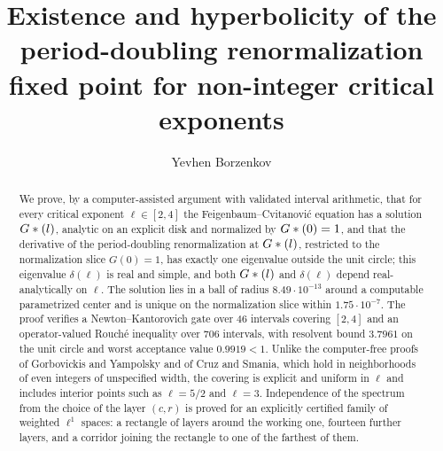 
\title[Hyperbolicity of renormalization at a non-integer exponent]
      {Existence and hyperbolicity of the period-doubling renormalization
       fixed point for non-integer critical exponents}

\ifx\ANONYMOUS\undefined
  \author{Yevhen Borzenkov}
  \address{Independent researcher, Bratislava, Slovakia}
\fi


\begin{abstract}
We prove, by a computer-assisted argument with validated interval arithmetic,
that for every critical exponent $\ell \in [2,4]$ the Feigenbaum--Cvitanovi\'{c}
equation has a solution $G*(l)$, analytic on an explicit disk and normalized
by $G*(0) = 1$, and that the derivative of the period-doubling renormalization
at $G*(l)$, restricted to the normalization slice $G(0) = 1$, has exactly one
eigenvalue outside the unit circle; this
eigenvalue $\delta(\ell)$ is real and simple, and both $G*(l)$ and
$\delta(\ell)$ depend real-analytically on $\ell$. The solution lies in a ball of
radius $8.49 \cdot 10^{-13}$ around a computable parametrized center and is
unique on the normalization slice within $1.75 \cdot 10^{-7}$. The proof verifies
a Newton--Kantorovich gate over 46 intervals covering $[2,4]$ and an
operator-valued Rouch\'{e} inequality over 706 intervals, with resolvent bound
$3.7961$ on the unit circle and worst acceptance value $0.9919 < 1$. Unlike the
computer-free proofs of Gorbovickis and Yampolsky and of Cruz and Smania, which
hold in neighborhoods of even integers of unspecified width, the covering is
explicit and uniform in $\ell$ and includes interior points such as
$\ell = 5/2$ and $\ell = 3$. Independence of the spectrum from the choice of the
layer $(c, r)$ is proved for an explicitly certified family of weighted
$\ell^{1}$ spaces: a rectangle of layers around the working one, fourteen
further layers, and a corridor joining the rectangle to one of the farthest of them.
\end{abstract}

\maketitle
